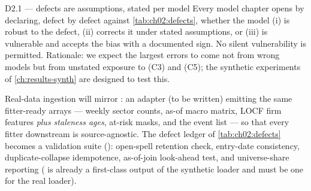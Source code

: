 \begin{decision}{D2.1 --- defects are assumptions, stated per model}
Every model chapter opens by declaring, defect by defect against
\cref{tab:ch02:defects}, whether the model (i) is robust to the defect,
(ii) corrects it under stated assumptions, or (iii) is vulnerable and
accepts the bias with a documented sign. No silent vulnerability is
permitted. Rationale: we expect the largest errors to come not from wrong
models but from unstated exposure to (C3) and (C5); the synthetic
experiments of \cref{ch:results-synth} are designed to test this.
\end{decision}

\begin{codehooks}
Real-data ingestion will mirror : an adapter
 (to be written) emitting the same
fitter-ready arrays --- weekly sector counts, as-of macro matrix, LOCF firm
features \emph{plus staleness ages}, at-risk masks, and the event list ---
so that every fitter downstream is source-agnostic. The defect ledger of
\cref{tab:ch02:defects} becomes a validation suite
(): open-spell retention check, entry-date
consistency, duplicate-collapse idempotence, as-of-join look-ahead test,
and universe-share reporting ( is already a
first-class output of the synthetic loader and must be one for the real
loader).
\end{codehooks}
